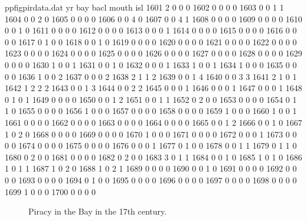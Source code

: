 \begin{filecontents}{ppfigpirdata.dat}
yr	bay	bacl	mouth	isl
1601	2	0	0	0
1602	0	0	0	0
1603	0	0	1	1
1604	0	0	2	0
1605	0	0	0	0
1606	0	0	4	0
1607	0	0	4	1
1608	0	0	0	0
1609	0	0	0	0
1610	0	0	1	0
1611	0	0	0	0
1612	0	0	0	0
1613	0	0	0	1
1614	0	0	0	0
1615	0	0	0	0
1616	0	0	0	0
1617	0	1	0	0
1618	0	0	1	0
1619	0	0	0	0
1620	0	0	0	0
1621	0	0	0	0
1622	0	0	0	0
1623	0	0	0	0
1624	0	0	0	0
1625	0	0	0	0
1626	0	0	0	0
1627	0	0	0	0
1628	0	0	0	0
1629	0	0	0	0
1630	1	0	0	1
1631	0	0	1	0
1632	0	0	0	1
1633	1	0	0	1
1634	1	0	0	0
1635	0	0	0	0
1636	1	0	0	2
1637	0	0	0	2
1638	2	1	1	2
1639	0	0	1	4
1640	0	0	3	3
1641	2	1	0	1
1642	1	2	2	2
1643	0	0	1	3
1644	0	0	2	2
1645	0	0	0	1
1646	0	0	0	1
1647	0	0	0	1
1648	0	1	0	1
1649	0	0	0	0
1650	0	0	1	2
1651	0	0	1	1
1652	0	2	0	0
1653	0	0	0	0
1654	0	1	1	0
1655	0	0	0	0
1656	1	0	0	0
1657	0	0	0	0
1658	0	0	0	0
1659	1	0	0	0
1660	1	0	0	1
1661	0	0	0	0
1662	0	0	0	0
1663	0	0	0	0
1664	0	0	0	0
1665	0	0	1	2
1666	0	0	1	0
1667	1	0	2	0
1668	0	0	0	0
1669	0	0	0	0
1670	1	0	0	0
1671	0	0	0	0
1672	0	0	0	1
1673	0	0	0	0
1674	0	0	0	0
1675	0	0	0	0
1676	0	0	0	1
1677	0	1	0	0
1678	0	0	1	1
1679	0	1	1	0
1680	0	2	0	0
1681	0	0	0	0
1682	0	2	0	0
1683	3	0	1	1
1684	0	0	1	0
1685	1	0	1	0
1686	1	0	1	1
1687	1	0	2	0
1688	1	0	2	1
1689	0	0	0	0
1690	0	0	1	0
1691	0	0	0	0
1692	0	0	0	0
1693	0	0	0	0
1694	0	1	0	0
1695	0	0	0	0
1696	0	0	0	0
1697	0	0	0	0
1698	0	0	0	0
1699	1	0	0	0
1700	0	0	0	0
\end{filecontents}
\begin{figure}
\begin{sideways}
\end{sideways}
\caption{Piracy in the Bay in the 17th century.}
\label{fig:piracyinbay}
\end{figure}
%
